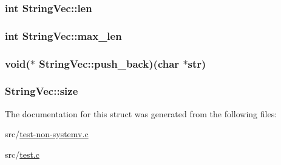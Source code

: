 \subsubsection[{\texorpdfstring{len}{len}}]{\setlength{\rightskip}{0pt plus 5cm}int String\+Vec\+::len}\hypertarget{struct_string_vec_a7c24f16a046318d0be2902e0b40f07e4}{}\label{struct_string_vec_a7c24f16a046318d0be2902e0b40f07e4}
\subsubsection[{\texorpdfstring{max\+\_\+len}{max_len}}]{\setlength{\rightskip}{0pt plus 5cm}int String\+Vec\+::max\+\_\+len}\hypertarget{struct_string_vec_a78df5c5f47656d385e2f6d1f2e9ed62b}{}\label{struct_string_vec_a78df5c5f47656d385e2f6d1f2e9ed62b}
\subsubsection[{\texorpdfstring{push\+\_\+back}{push_back}}]{\setlength{\rightskip}{0pt plus 5cm}void($\ast$ String\+Vec\+::push\+\_\+back)(char $\ast$str)}\hypertarget{struct_string_vec_af05c9a2ae87afdb54531240ca7ff125d}{}\label{struct_string_vec_af05c9a2ae87afdb54531240ca7ff125d}
\subsubsection[{\texorpdfstring{size}{size}}]{ String\+Vec\+::size}\hypertarget{struct_string_vec_ae4ae32f5a45935a1d362357d264b6c2c}{}\label{struct_string_vec_ae4ae32f5a45935a1d362357d264b6c2c}


The documentation for this struct was generated from the following files\+:\begin{DoxyCompactItemize}
\item 
src/\hyperlink{test-non-systemv_8c}{test-\/non-\/systemv.\+c}\item 
src/\hyperlink{test_8c}{test.\+c}\end{DoxyCompactItemize}
